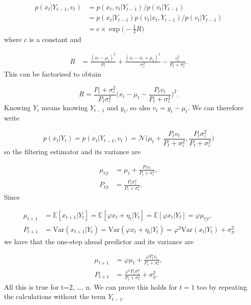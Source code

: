 \documentclass[11pt,a4paper]{article}
\newcommand{\E}{\mathbb{E}}
\newcommand{\var}{\mathrm{Var}}
\begin{document}
\begin{align*}
    p(x_t|Y_{t-1},v_t) &= p(x_t, v_t|Y_{t-1})/p(v_t|Y_{t-1})\\
    &= p(x_t|Y_{t-1})p(v_t|x_t,Y_{t-1})/p(v_t|Y_{t-1})\\
    &= c\times \exp\Big(-\frac{1}{2} R\Big)
\end{align*}
where $c$ is a constant and

\begin{align*}
    R &= \frac{(x_t - \mu_t)^2}{P_t} + \frac{(v_t - x_t + \mu_t)^2}{\sigma^2_\varepsilon} - \frac{v^2_t}{P_t + \sigma^2_\varepsilon}.
\end{align*}
This can be factorised to obtain

\[
    R = \frac{P_t + \sigma^2_\varepsilon}{P_t\sigma^2_\varepsilon} \Bigg(x_t - \mu_t - \frac{P_t v_t}{P_t + \sigma^2_\varepsilon} \Bigg)^2.
\]
{\color{blue} Knowing $Y_t$ means knowing $Y_{t-1}$ and $y_t$}, so also $v_t = y_t - \mu_t$. We can therefore write

\[
    p(x_t|Y_t) = p(x_t|Y_{t-1}, v_t) = \mathcal{N}\Bigg(\mu_t + \frac{P_t v_t}{P_t + \sigma^2_\varepsilon}, \frac{P_t\sigma^2_\varepsilon}{P_t + \sigma^2_\varepsilon} \Bigg)
\]
so the filtering estimator and its variance are

\begin{align*}
    \mu_{t|t} &= \mu_t + \frac{P_t v_t}{P_t + \sigma^2_\varepsilon},\\
    P_{t|t} &= \frac{P_t\sigma^2_\varepsilon}{P_t + \sigma^2_\varepsilon}.
\end{align*}
Since

\begin{align*}
    \mu_{t+1} &= \E[x_{t+1}|Y_t] = \E[\varphi x_t + \eta_t|Y_t] = \E[\varphi x_t|Y_t] = \varphi \mu_{t|t},\\
    P_{t+1} &= \var(x_{t+1}|Y_t) = \var(\varphi x_t + \eta_t|Y_t) = \varphi^2 \var(x_t|Y_t) + \sigma^2_\eta
\end{align*}
we have that the one-step ahead predictor and its variance are

\begin{align*}
    \mu_{t+1} &= \varphi \mu_t + \frac{\varphi P_t v_t}{P_t + \sigma^2_\varepsilon},\\
    P_{t+1} &= \frac{\varphi^2  P_t\sigma^2_\varepsilon}{P_t + \sigma^2_\varepsilon} + \sigma^2_\eta.
\end{align*}
All this is true for t=2, \dots, n. We can prove this holds for $t=1$ too by repeating the calculations without the term $Y_{t-1}$.
\end{document}
